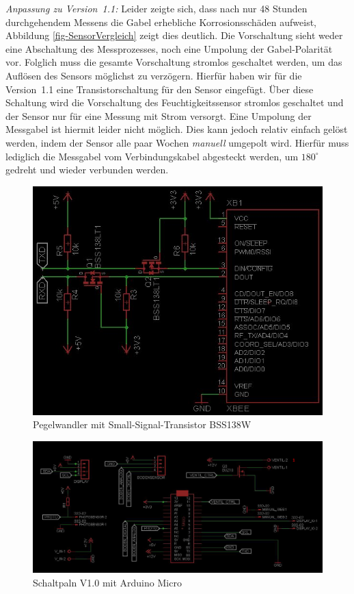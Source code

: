 \emph{Anpassung zu Version~1.1:}
Leider zeigte sich, dass nach nur 48 Stunden durchgehendem Messens die Gabel erhebliche Korrosionsschäden aufweist, Abbildung \ref{fig-SensorVergleich} zeigt dies deutlich.
Die Vorschaltung sieht weder eine Abschaltung des Messprozesses, noch eine Umpolung der Gabel-Polarität vor. 
Folglich muss die gesamte Vorschaltung stromlos geschaltet werden, um das Auflösen des Sensors möglichst zu verzögern. 
Hierfür haben wir für die Version~1.1 eine Transistorschaltung für den Sensor eingefügt. 
Über diese Schaltung wird die Vorschaltung des Feuchtigkeitssensor stromlos geschaltet und der Sensor nur für eine Messung mit Strom versorgt. 
Eine Umpolung der Messgabel ist hiermit leider nicht möglich. Dies kann jedoch relativ einfach gelöst werden, indem der Sensor alle paar Wochen \emph{manuell} umgepolt wird. 
Hierfür muss lediglich die Messgabel vom Verbindungskabel abgesteckt werden, um \begin{math}180^{\circ}\end{math} gedreht und wieder verbunden werden.



\begin{figure}[h]
	\centering
	\includegraphics[width=0.9\linewidth]{bilder/v1SchaltplanXbee.jpg}
	\caption{Pegelwandler mit Small-Signal-Transistor BSS138W }
	\label{fig-Pegel}
\end{figure}

\begin{figure}[th]
	\centering
	\includegraphics[width=0.85\linewidth]{bilder/v1SchaltplanMicro0.JPG}
	\caption{Schaltpaln V1.0 mit Arduino Micro}
	\label{fig-Schaltplanv1.0}
\end{figure}

